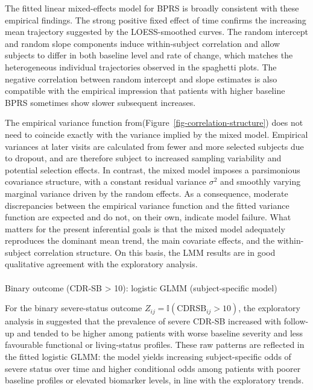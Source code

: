 \documentclass[
  9pt,
  letterpaper,
  DIV=11,
  numbers=noendperiod]{scrartcl}
\makeatletter
\let\oldparagraph\paragraph
\renewcommand{\paragraph}{
    \@ifstar
      \xxxParagraphStar
      \xxxParagraphNoStar
  }
\newcommand{\xxxParagraphStar}[1]{\oldparagraph*{#1}\mbox{}}
\newcommand{\xxxParagraphNoStar}[1]{\oldparagraph{#1}\mbox{}}
\makeatother
\begin{document}
The fitted linear mixed-effects model for BPRS is broadly consistent
with these empirical findings. The strong positive fixed effect of time
confirms the increasing mean trajectory suggested by the LOESS-smoothed
curves. The random intercept and random slope components induce
within-subject correlation and allow subjects to differ in both baseline
level and rate of change, which matches the heterogeneous individual
trajectories observed in the spaghetti plots. The negative correlation
between random intercept and slope estimates is also compatible with the
empirical impression that patients with higher baseline BPRS sometimes
show slower subsequent increases.

The empirical variance function
from(Figure~\ref{fig-correlation-structure}) does not need to coincide
exactly with the variance implied by the mixed model. Empirical
variances at later visits are calculated from fewer and more selected
subjects due to dropout, and are therefore subject to increased sampling
variability and potential selection effects. In contrast, the mixed
model imposes a parsimonious covariance structure, with a constant
residual variance \(\sigma^2\) and smoothly varying marginal variance
driven by the random effects. As a consequence, moderate discrepancies
between the empirical variance function and the fitted variance function
are expected and do not, on their own, indicate model failure. What
matters for the present inferential goals is that the mixed model
adequately reproduces the dominant mean trend, the main covariate
effects, and the within-subject correlation structure. On this basis,
the LMM results are in good qualitative agreement with the exploratory
analysis.

\paragraph{Binary outcome (CDR-SB \textgreater{} 10): logistic GLMM
(subject-specific
model)}\label{binary-outcome-cdr-sb-10-logistic-glmm-subject-specific-model}

For the binary severe-status outcome
\(Z_{ij}=\mathbb{I}(\mathrm{CDRSB}_{ij}>10)\), the exploratory analysis
in suggested that the prevalence of severe CDR-SB increased with
follow-up and tended to be higher among patients with worse baseline
severity and less favourable functional or living-status profiles. These
raw patterns are reflected in the fitted logistic GLMM: the model yields
increasing subject-specific odds of severe status over time and higher
conditional odds among patients with poorer baseline profiles or
elevated biomarker levels, in line with the exploratory trends.
\end{document}
